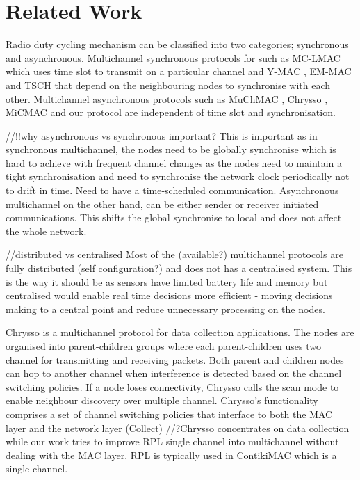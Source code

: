 \section{Related Work}

Radio duty cycling mechanism can be classified into two categories; synchronous and asynchronous. Multichannel synchronous protocols for such as MC-LMAC \cite{mc-lmac} which uses time slot to transmit on a particular channel and Y-MAC \cite{y-mac}, EM-MAC \cite{emmac} and TSCH that depend on the neighbouring nodes to synchronise with each other. Multichannel asynchronous protocols such as MuChMAC \cite{muchmac}, Chrysso \cite{chrysso}, MiCMAC \cite{micmac} and our protocol are independent of time slot and synchronisation. 

//!!why asynchronous vs synchronous important?
This is important as in synchronous multichannel, the nodes need to be globally synchronise which is hard to achieve with frequent channel changes as the nodes need to maintain a tight synchronisation and need to synchronise the network clock periodically not to drift in time. Need to have a time-scheduled communication. Asynchronous multichannel on the other hand, can be either sender or receiver initiated communications. This shifts the global synchronise to local and does not affect the whole network.

//distributed vs centralised
Most of the (available?) multichannel protocols are fully distributed (self configuration?) and does not has a centralised system. This is the way it should be as sensors have limited battery life and memory but centralised would enable real time decisions more efficient - moving decisions making to a central point and reduce unnecessary processing on the nodes.

Chrysso \cite{chrysso} is a multichannel protocol for data collection applications. The nodes are organised into parent-children groups where each parent-children uses two channel for transmitting and receiving packets. Both parent and children nodes can hop to another channel when interference is detected based on the channel switching policies. If a node loses connectivity, Chrysso calls the scan mode to enable neighbour discovery over multiple channel. Chrysso’s functionality comprises a set of channel switching policies that interface to both the MAC layer and the network layer (Collect)
//?Chrysso concentrates on data collection while our work tries to improve RPL single channel into multichannel without dealing with the MAC layer. RPL is typically used in ContikiMAC which is a single channel.

